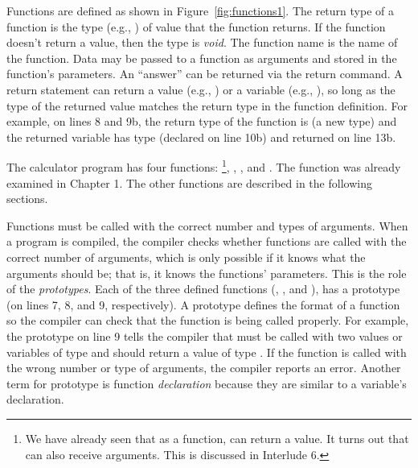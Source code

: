 Functions are defined as shown in Figure~\ref{fig:functions1}.
The return type of a function is the type (e.g., ) of value that the function returns.  If the function doesn't return a value, then the type is \emph{void}.  The function name is the name of the function.  Data may be passed to a function as arguments and stored in the function's parameters.  An ``answer'' can be returned via the return command.  A return statement can return a value (e.g., ) or a variable (e.g., ), so long as the type of the returned value matches the return type in the function definition.  For example, on lines 8 and 9b, the return type of the function  is  (a new type) and the returned variable  has type \emph{} (declared on line 10b) and returned on line 13b.

The calculator program has four functions: \footnote{We have already seen that as a function,  can return a value.  It turns out that  can also receive arguments.  This is discussed in Interlude 6.}, , , and .  The  function was already examined in Chapter 1.  The other functions are described in the following sections.

Functions must be called with the correct number and types of arguments.  When a program is compiled, the compiler checks whether functions are called with the correct number of arguments, which is only possible if it knows what the arguments should be; that is, it knows the functions' parameters.  This is the role of the \emph{prototypes}.  Each of the three defined functions (, , and ), has a prototype (on lines 7, 8, and 9, respectively).  A prototype defines the format of a function so the compiler can check that the function is being called properly.  For example, the prototype on line 9 tells the compiler that  must be called with two values or variables of type  and should return a value of type .  If the  function is called with the wrong number or type of arguments, the compiler reports an error.  Another term for prototype is function \emph{declaration} because they are similar to a variable's declaration.  


